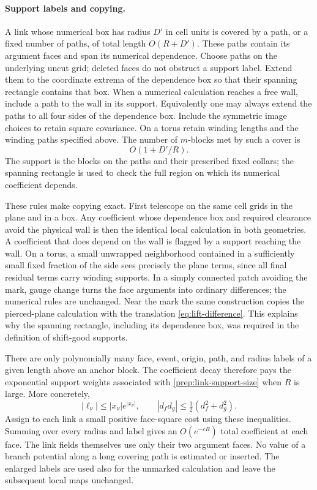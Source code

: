 \paragraph{Support labels and copying.}
A link whose numerical box has radius $D'$ in cell units is covered by
a path, or a fixed number of paths, of total length $O(R+D')$.  These
paths contain its argument faces and span its numerical dependence.
Choose paths on the underlying uncut grid; deleted faces do not obstruct
a support label.  Extend them to the coordinate extrema of the
dependence box so that their spanning rectangle contains that box.
When a numerical calculation reaches a free wall, include a path to
the wall in its support.  Equivalently one may always extend the paths
to all four sides of the dependence box.  Include the symmetric image
choices to retain square covariance.  On a torus retain winding lengths
and the winding paths specified above.  The number of $m$-blocks met by
such a cover is
\begin{equation}\label{prep:link-support-size}
                             O(1+D'/R).
\end{equation}
The support is the blocks on the paths and their prescribed fixed
collars; the spanning rectangle is used to check the full region on
which its numerical coefficient depends.

These rules make copying exact.  First telescope on the same cell grids
in the plane and in a box.  Any coefficient whose dependence box and
required clearance avoid the physical wall is then the identical local
calculation in both geometries.  A coefficient that does depend on the
wall is flagged by a support reaching the wall.  On a torus, a small
unwrapped neighborhood contained in a sufficiently small fixed fraction
of the side sees precisely the plane terms, since all final residual
terms carry winding supports.  In a simply connected patch avoiding the
mark, gauge change turns the face arguments into ordinary differences;
the numerical rules are unchanged.  Near the mark the same construction
copies the pierced-plane calculation with the translation
\eqref{eq:lift-difference}.  This explains why the spanning rectangle,
including its dependence box, was required in the definition of
shift-good supports.

There are only polynomially many face, event, origin, path, and radius
labels of a given length above an anchor block.  The coefficient decay
therefore pays the exponential support weights associated with
\eqref{prep:link-support-size} when $R$ is large.  More concretely,
\[
 |\ell_\nu|\le |x_\nu|e^{|x_\nu|},
 \qquad |d_fd_g|\le\tfrac12(d_f^2+d_g^2).
\]
Assign to each link a small positive face-square cost using these
inequalities.  Summing over every radius and label gives an
$O(e^{-cR})$ total coefficient at each face.  The link fields themselves
use only their two argument faces.  No value of a branch potential along
a long covering path is estimated or inserted.  The enlarged labels
are used also for the unmarked calculation and leave the subsequent
local maps unchanged.

